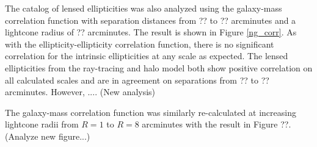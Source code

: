 \documentclass[%
 reprint,
 amsmath,amssymb,
 aps,nofootinbib
]{revtex4-1}
\begin{document}
The catalog of lensed ellipticities was also analyzed using the galaxy-mass correlation function with separation distances from ?? to ?? arcminutes and a lightcone radius of ?? arcminutes. The result is shown in Figure \ref{ng_corr}. As with the ellipticity-ellipticity correlation function, there is no significant correlation for the intrinsic ellipticities at any scale as expected. The lensed ellipticities from the ray-tracing and halo model both show positive correlation on all calculated scales and are in agreement on separations from ?? to ?? arcminutes. However, .... (New analysis)


The galaxy-mass correlation function was similarly re-calculated at increasing lightcone radii from $R=1$ to $R=8$ arcminutes with the result in Figure ??. (Analyze new figure...)

%
%

\end{document}
